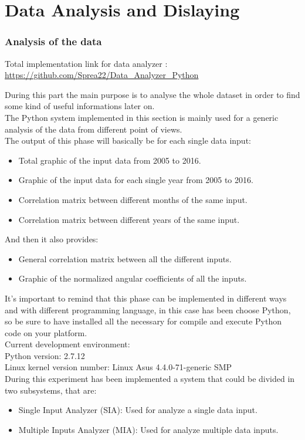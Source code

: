 \part{Data Analysis and Dislaying}
\section{Analysis of the data}
Total implementation link for data analyzer : \\
\url{https://github.com/Sprea22/Data_Analyzer_Python}

During this part the main purpose is to analyse the whole dataset in order to find some kind of useful informations later on. \\
The Python system implemented in this section is mainly used for a generic analysis of the data from different point of views.\\
The output of this phase will basically be for each single data input:
\begin{itemize}
\item Total graphic of the input data from 2005 to 2016.
\item Graphic of the input data for each single year from 2005 to 2016.
\item Correlation matrix between different months of the same input.
\item Correlation matrix between different years of the same input.
\end{itemize}

And then it also provides:
\begin{itemize}
\item General correlation matrix between all the different inputs.
\item Graphic of the normalized angular coefficients of all the inputs.
\end{itemize}

It's important to remind that this phase can be implemented in different ways and with different programming language, in this case has been choose Python, so be sure to have installed all the necessary for compile and execute Python code on your platform.\\
Current development environment:\\
Python version: 2.7.12\\
Linux kernel version number: Linux Asus 4.4.0-71-generic SMP\\

During this experiment has been implemented a system that could be divided in two subsystems, that are:
\begin{itemize}
\item Single Input Analyzer (SIA): Used for analyze a single data input.
\item Multiple Inputs Analyzer (MIA): Used for analyze multiple data inputs.
\end{itemize}
\newpage


